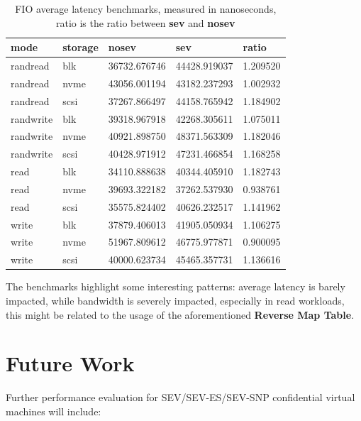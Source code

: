 \documentclass[twocolumn]{article}
\begin{document}
    \begin{table}
        \small
        \label{tab:al}
        \begin{tabular}{lllll}
            \hline
            \textbf{mode}& \textbf{storage} & \textbf{nosev} & \textbf{sev} & \textbf{ratio} \\
            \hline
            randread & blk & 36732.676746 & 44428.919037 & 1.209520 \\
            randread & nvme & 43056.001194 & 43182.237293 & 1.002932 \\
            randread & scsi & 37267.866497 & 44158.765942 & 1.184902 \\
            randwrite & blk & 39318.967918 & 42268.305611 & 1.075011 \\
            randwrite & nvme & 40921.898750 & 48371.563309 & 1.182046 \\
            randwrite & scsi & 40428.971912 & 47231.466854 & 1.168258 \\
            read & blk & 34110.888638 & 40344.405910 & 1.182743 \\
            read & nvme & 39693.322182 & 37262.537930 & 0.938761 \\
            read & scsi & 35575.824402 & 40626.232517 & 1.141962 \\
            write & blk & 37879.406013 & 41905.050934 & 1.106275 \\
             write & nvme & 51967.809612 & 46775.977871 & 0.900095 \\
             write & scsi & 40000.623734 & 45465.357731 & 1.136616 \\
            \hline
        \end{tabular}
        \caption{FIO average latency benchmarks, measured in nanoseconds, ratio is the ratio between \textbf{sev} and \textbf{nosev}}
    \end{table}

    The benchmarks highlight some interesting patterns: average latency is barely impacted, while bandwidth is severely impacted, especially in read workloads, this might be related to the usage of the aforementioned \textbf{Reverse Map Table}. 

    \section{Future Work}
        Further performance evaluation for SEV/SEV-ES/SEV-SNP confidential virtual machines will include:
\end{document}
